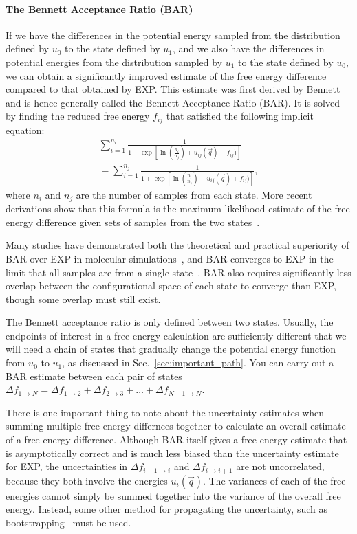 \documentclass[9pt,bestpractices]{livecoms}
\begin{document}
\paragraph{The Bennett Acceptance Ratio (BAR)}
If we have the differences in the potential energy sampled from the distribution defined by $u_0$ to the state defined by $u_1$, and we also have the differences in potential energies from the distribution sampled by $u_1$ to the state defined by $u_0$, we can obtain a significantly improved estimate of the
free energy difference compared to that obtained by EXP. 
This estimate was first derived by Bennett and is hence generally called the Bennett Acceptance Ratio (BAR). It is solved by finding the reduced free energy $f_{ij}$ that satisfied the following implicit equation:
\begin{eqnarray}
 \sum_{i=1}^{n_i} \frac{1}{1 + \exp[\ln(\frac{n_i}{n_j}) + u_{ij}(\vec{q}) - f_{ij})
 ]} \nonumber \\
 =\sum_{i=1}^{n_j} \frac{1}{1 + \exp[\ln(\frac{n_i}{n_j}) - u_{ij}(\vec{q}) + f_{ij})]},
\end{eqnarray}
where $n_i$ and $n_j$ are the number of samples from each state. More recent derivations show that this formula is the maximum likelihood estimate of the free energy difference given sets of samples from the two states~\cite{shirts2003equilibrium}. 

Many studies have demonstrated both the theoretical and practical superiority of BAR over EXP in molecular
simulations~\cite{shirts2005comparison,lu2003appropriate}, and BAR converges to EXP in the limit that all samples are from a single state~\cite{bennett1976efficient,bennett1976efficient,shirts2003equilibrium}. BAR also requires significantly less overlap between the configurational space of each state to converge than EXP, though some overlap must still exist.

The Bennett acceptance ratio is only defined between two states. Usually, the endpoints of interest in a free energy calculation are sufficiently different that we will need a chain of states that gradually change the potential energy function from $u_0$ to $u_1$, as discussed in Sec.~\ref{sec:important_path}. You can carry out a BAR estimate between each pair of states $\Delta f_{1 \rightarrow N} = \Delta {f_{1\rightarrow 2}} + \Delta {f_{2\rightarrow 3}} +  \ldots + \Delta f_{N-1\rightarrow N}$.

There is one important thing to note about the uncertainty estimates when summing multiple free energy differnces together to calculate an overall estimate of a free energy difference. Although BAR itself gives a free energy estimate that is asymptotically correct and is much less biased than the uncertainty estimate for EXP, the uncertainties in $\Delta {f_{i-1\rightarrow i}}$ and $\Delta {f_{i\rightarrow i+1}}$ are not uncorrelated, because they both involve the energies $u_i(\vec{q})$. The variances of each of the free energies cannot simply be summed together into the variance of the overall free energy. Instead, some other method for propagating the uncertainty, such as bootstrapping~\cite{grossfield2018best} must be used.
\end{document}
